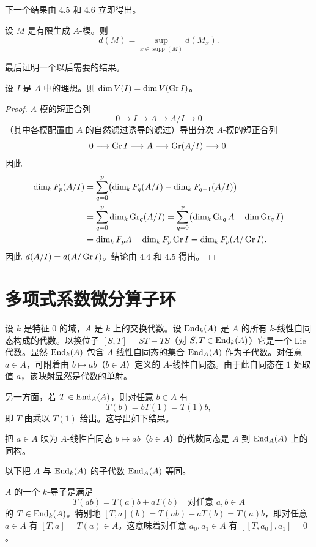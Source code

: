 下一个结果由 4.5 和 4.6 立即得出。

\begin{corollary}
设 $M$ 是有限生成 $A$-模。则
$$d(M)=\sup_{x\in\operatorname{supp}(M)} d(M_x).$$
\end{corollary}

最后证明一个以后需要的结果。

\begin{lemma}
设 $I$ 是 $A$ 中的理想。则 $\dim V(I)=\dim V(\operatorname{Gr} I)$。
\end{lemma}

\begin{proof}
$A$-模的短正合列
$$0\longrightarrow I\longrightarrow A\longrightarrow A/I\longrightarrow 0$$
（其中各模配置由 $A$ 的自然滤过诱导的滤过）导出分次 $A$-模的短正合列
$$0\longrightarrow\operatorname{Gr} I\longrightarrow A\longrightarrow\operatorname{Gr}(A/I)\longrightarrow 0.$$
因此
\begin{align*}
\dim_k F_p(A/I)&=\sum_{q=0}^{p}\bigl(\dim_k F_q(A/I)-\dim_k F_{q-1}(A/I)\bigr)\\
&=\sum_{q=0}^{p}\dim_k\operatorname{Gr}_q(A/I)=\sum_{q=0}^{p}\bigl(\dim_k\operatorname{Gr}_q A-\dim\operatorname{Gr}_q I\bigr)\\
&=\dim_k F_p A-\dim_k F_p\operatorname{Gr} I=\dim_k F_p(A/\operatorname{Gr} I).
\end{align*}
因此 $d(A/I)=d(A/\operatorname{Gr} I)$。结论由 4.4 和 4.5 得出。
\end{proof}

\section{多项式系数微分算子环}

设 $k$ 是特征 $0$ 的域，$A$ 是 $k$ 上的交换代数。设 $\operatorname{End}_k(A)$ 是 $A$ 的所有 $k$-线性自同态构成的代数。以换位子 $[S,T]=ST-TS$（对 $S,T\in\operatorname{End}_k(A)$）它是一个 Lie 代数。显然 $\operatorname{End}_k(A)$ 包含 $A$-线性自同态的集合 $\operatorname{End}_A(A)$ 作为子代数。对任意 $a\in A$，可附着由 $b\longmapsto ab$（$b\in A$）定义的 $A$-线性自同态。由于此自同态在 $1$ 处取值 $a$，该映射显然是代数的单射。

另一方面，若 $T\in\operatorname{End}_A(A)$，则对任意 $b\in A$ 有
$$T(b)=bT(1)=T(1)b,$$
即 $T$ 由乘以 $T(1)$ 给出。这导出如下结果。

\begin{lemma}
把 $a\in A$ 映为 $A$-线性自同态 $b\longmapsto ab$（$b\in A$）的代数同态是 $A$ 到 $\operatorname{End}_A(A)$ 上的同构。
\end{lemma}

以下把 $A$ 与 $\operatorname{End}_k(A)$ 的子代数 $\operatorname{End}_A(A)$ 等同。

$A$ 的一个 $k$-导子是满足
$$T(ab)=T(a)b+aT(b)\quad\text{对任意 }a,b\in A$$
的 $T\in\operatorname{End}_k(A)$。特别地 $[T,a](b)=T(ab)-aT(b)=T(a)b$，即对任意 $a\in A$ 有 $[T,a]=T(a)\in A$。这意味着对任意 $a_0,a_1\in A$ 有 $[[T,a_0],a_1]=0$。

